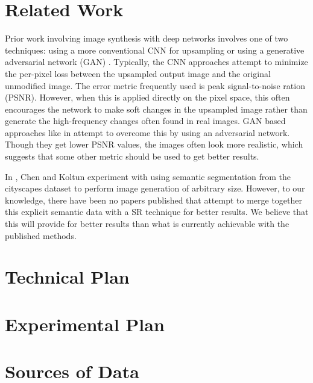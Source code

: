 \documentclass[10pt,twocolumn,letterpaper]{article}
\begin{document}
\section{Related Work}
Prior work involving image synthesis with deep networks involves one of two techniques: using a more conventional CNN for upsampling \cite{PerceptualLosses} \cite{RealtimeCNN} \cite{DeeplyRecursive} or using a generative adversarial network (GAN) \cite{GAN}. Typically, the CNN approaches attempt to minimize the per-pixel loss between the upsampled output image and the original unmodified image. The error metric frequently used is peak signal-to-noise ration (PSNR). However, when this is applied directly on the pixel space, this often encourages the network to make soft changes in the upsampled image rather than generate the high-frequency changes often found in real images. GAN based approaches like in \cite{SRGAN} attempt to overcome this by using an adversarial network. Though they get lower PSNR values, the images often look more realistic, which suggests that some other metric should be used to get better results.

In \cite{ImageSynthesis}, Chen and Koltun experiment with using semantic segmentation from the cityscapes dataset \cite{Cityscapes} to perform image generation of arbitrary size. However, to our knowledge, there have been no papers published that attempt to merge together this explicit semantic data with a SR technique for better results. We believe that this will provide for better results than what is currently achievable with the published methods.


\section{Technical Plan}


\section{Experimental Plan}


\section{Sources of Data}
\end{document}
